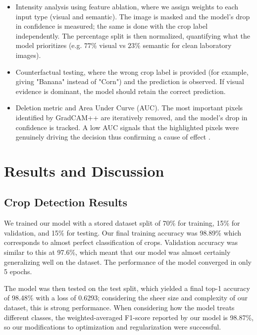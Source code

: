 \documentclass[runningheads]{llncs}
\begin{document}
\begin{itemize}
    \item Intensity analysis using feature ablation, where we assign weights to each input type (visual and semantic). The image is masked and the model's drop in confidence is measured; the same is done with the crop label independently. The percentage split is then normalized, quantifying what the model prioritizes (e.g. $77\%$ visual vs $23\%$ semantic for clean laboratory images). 

    \item Counterfactual testing, where the wrong crop label is provided (for example, giving "Banana" instead of "Corn") and the prediction is observed. If visual evidence is dominant, the model should retain the correct prediction.

    \item Deletion metric and Area Under Curve (AUC). The most important pixels identified by GradCAM++ are iteratively removed, and the model's drop in confidence is tracked. A low AUC signals that the highlighted pixels were genuinely driving the decision thus confirming a cause of effect \cite{petsiuk2018rise}.
\end{itemize}

\section{Results and Discussion}
\label{sec:results}

\subsection{Crop Detection Results}

We trained our model with a stored dataset split of 70\% for training, 15\% for validation, and 15\% for testing. Our final training accuracy was 98.89\% which corresponds to almost perfect classification of crops. Validation accuracy was similar to this at 97.6\%, which meant that our model was almost certainly generalizing well on the dataset. The performance of the model converged in only 5 epochs.

The model was then tested on the test split, which yielded a final top-1 accuracy of 98.48\% with a loss of 0.6293; considering the sheer size and complexity of our dataset, this is strong performance. When considering how the model treats different classes, the weighted-averaged F1-score reported by our model is 98.87\%, so our modifications to optimization and regularization were successful.
\end{document}
